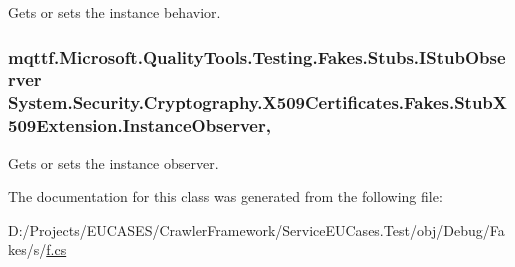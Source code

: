 Gets or sets the instance behavior.

\hypertarget{class_system_1_1_security_1_1_cryptography_1_1_x509_certificates_1_1_fakes_1_1_stub_x509_extension_a38baeb6a5fff8d1a8f5f1f84d4d07e5c}{
\subsubsection[{Instance\-Observer}]{\setlength{\rightskip}{0pt plus 5cm}mqttf.\-Microsoft.\-Quality\-Tools.\-Testing.\-Fakes.\-Stubs.\-I\-Stub\-Observer System.\-Security.\-Cryptography.\-X509\-Certificates.\-Fakes.\-Stub\-X509\-Extension.\-Instance\-Observer\hspace{0.3cm}{\ttfamily [get]}, {\ttfamily [set]}}}\label{class_system_1_1_security_1_1_cryptography_1_1_x509_certificates_1_1_fakes_1_1_stub_x509_extension_a38baeb6a5fff8d1a8f5f1f84d4d07e5c}


Gets or sets the instance observer.



The documentation for this class was generated from the following file\-:\begin{DoxyCompactItemize}
\item 
D\-:/\-Projects/\-E\-U\-C\-A\-S\-E\-S/\-Crawler\-Framework/\-Service\-E\-U\-Cases.\-Test/obj/\-Debug/\-Fakes/s/\hyperlink{s_2f_8cs}{f.\-cs}\end{DoxyCompactItemize}
